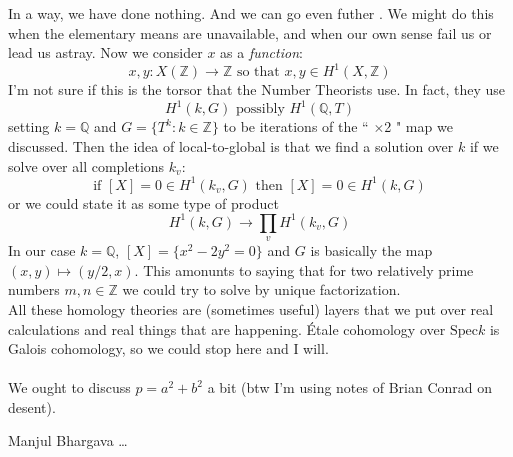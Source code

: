 \documentclass[12pt]{article}
\begin{document}
In a way, we have done nothing.  And we can go even futher .  We might do this when the elementary means are unavailable, and when our own sense fail us or lead us astray.  Now we consider $x$ as a \textit{function}:
$$ x, y : X(\mathbb{Z}) \to \mathbb{Z} \text{ so that } x, y \in H^1(X, \mathbb{Z})$$
I'm not sure if this is the torsor that the Number Theorists use.  In fact, they use 
$$ H^1(k, G) \text{ possibly } H^1(\mathbb{Q}, T) $$
setting $k = \mathbb{Q}$ and $G = \{ T^k: k \in \mathbb{Z}\}$ to be iterations of the `` $\times$2 " map we discussed.  Then the idea of local-to-global is that we find a solution over $k$ if we solve over all completions $k_v$:
$$ \text{if }[X]= 0 \in H^1(k_v, G) \text{ then }[X]=0 \in H^1(k, G) $$
or we could state it as some type of product
$$ H^1(k, G) \to \prod_v H^1(k_v, G) $$
In our case $k = \mathbb{Q}$, $[X] = \{  x^2 - 2y^2 = 0\}$ and $G $ is basically the map $(x,y) \mapsto (y/2, x)$.  This amonunts to saying that for two relatively prime numbers $m, n \in \mathbb{Z}$ we could try to solve by unique factorization.
$$  $$
All these homology theories are (sometimes useful) layers that we put over real calculations and real things that are happening.  \'{E}tale cohomology over $\mathrm{Spec} k$ is Galois cohomology, so we could stop here and I will. \\ \\
We ought to discuss $p = a^2 + b^2$ a bit (btw I'm using notes of Brian Conrad on desent).
\vfill

\begin{thebibliography}{}
\item Manjul Bhargava \dots
\end{thebibliography}
\end{document}
